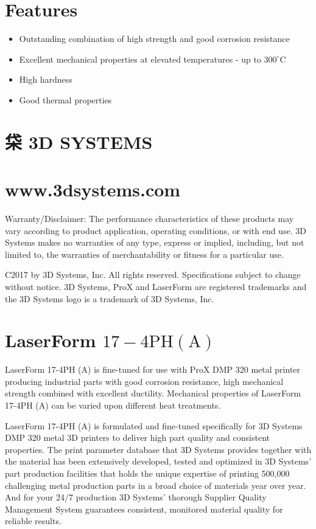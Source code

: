 \documentclass[10pt]{article}
\begin{document}
\section*{Features}
\begin{itemize}
  \item Outstanding combination of high strength and good corrosion resistance

  \item Excellent mechanical properties at elevated temperatures - up to $300^{\circ} \mathrm{C}$

  \item High hardness

  \item Good thermal properties

\end{itemize}

\section*{柋 3D SYSTEMS}
\section*{www.3dsystems.com}
Warranty/Disclaimer: The performance characteristics of these products may vary according to product application, operating conditions, or with end use. 3D Systems makes no warranties of any type, express or implied, including, but not limited to, the warranties of merchantability or fitness for a particular use.

C2017 by 3D Systems, Inc. All rights reserved. Specifications subject to change without notice. 3D Systems, ProX and LaserForm are registered trademarks and the 3D Systems logo is a trademark of 3D Systems, Inc.

\section*{LaserForm $17-4 \mathrm{PH}(\mathrm{A})$}
LaserForm 17-4PH (A) is fine-tuned for use with ProX DMP 320 metal printer producing industrial parts with good corrosion resistance, high mechanical strength combined with excellent ductility. Mechanical properties of LaserForm 17-4PH (A) can be varied upon different heat treatments.

LaserForm 17-4PH (A) is formulated and fine-tuned specifically for 3D Systems DMP 320 metal 3D printers to deliver high part quality and consistent properties. The print parameter database that 3D Systems provides together with the material has been extensively developed, tested and optimized in 3D Systems' part production facilities that holds the unique expertise of printing 500,000 challenging metal production parts in a broad choice of materials year over year. And for your 24/7 production 3D Systems' thorough Supplier Quality Management System guarantees consistent, monitored material quality for reliable results.
\end{document}
